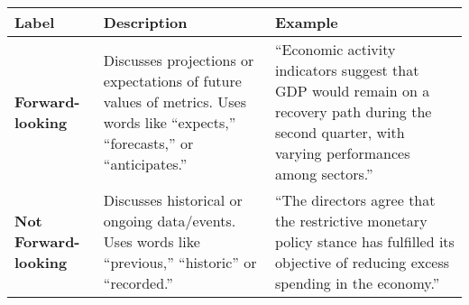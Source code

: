 \begin{table*}
    \caption{}
    \vspace{1em}
    \begin{tabular}{p{}p{}p{}}
    \toprule
    \textbf{Label} & \textbf{Description} & \textbf{Example}\\
    \midrule
    \textbf{Forward-looking} & Discusses projections or expectations of future values of metrics. Uses words like ``expects,'' ``forecasts,'' or ``anticipates.'' & ``Economic activity indicators suggest that GDP would remain on a recovery path during the second quarter, with varying performances among sectors.'' \\
    \midrule
    \textbf{Not Forward-looking} & Discusses historical or ongoing data/events. Uses words like ``previous,'' ``historic'' or ``recorded.'' & ``The directors agree that the restrictive monetary policy stance has fulfilled its objective of reducing excess spending in the economy.'' \\
    \bottomrule
    \end{tabular}
    \label{tb:banrep_forward_looking_guide}
    \end{table*}